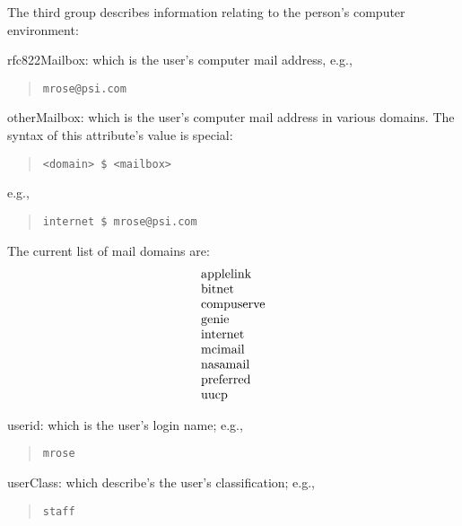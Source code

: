 The third group describes information relating to the person's
computer environment:
\begin{describe}
\item[rfc822Mailbox:]
			which is the user's computer mail address,
			e.g., 
\begin{quote}\small\begin{verbatim}
mrose@psi.com
\end{verbatim}\end{quote}

\item[otherMailbox:]
			which is the user's computer mail address
			in various domains.
			The syntax of this attribute's value is special:
\begin{quote}\small\begin{verbatim}
<domain> $ <mailbox>
\end{verbatim}\end{quote}
			e.g., 
\begin{quote}\small\begin{verbatim}
internet $ mrose@psi.com
\end{verbatim}\end{quote}
The current list of mail domains are:
\[\begin{tabular}{l}
applelink\\
bitnet\\
compuserve\\
genie\\
internet\\
mcimail\\
nasamail\\
preferred\\
uucp
\end{tabular}\]

\item[userid:]
			which is the user's login name; e.g.,
\begin{quote}\small\begin{verbatim}
mrose
\end{verbatim}\end{quote}

\item[userClass:]
			which describe's the user's classification; e.g.,
\begin{quote}\small\begin{verbatim}
staff
\end{verbatim}\end{quote}
\end{describe}
